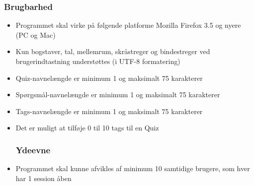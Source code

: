 \subsubsection*{Brugbarhed}
\begin{itemize}
	\item Programmet skal virke på følgende platforme
	\subitem Mozilla Firefox 3.5 og nyere (PC og Mac)
	\item Kun bogstaver, tal, mellemrum, skråstreger og bindestreger ved brugerindtastning
understøttes (i UTF-8 formatering)
	\item Quiz-navnelængde er minimum 1 og maksimalt 75 karakterer
	\item Spørgsmål-navnelængde er minimum 1 og maksimalt 75 karakterer
	\item Tags-navnelængde er minimum 1 og maksimalt 75 karakterer
	\item Det er muligt at tilføje 0 til 10 tags til en Quiz

\subsubsection*{Ydeevne}
	\item Programmet skal kunne afvikles af minimum 10 samtidige brugere, som hver har 1 session åben

\end{itemize}